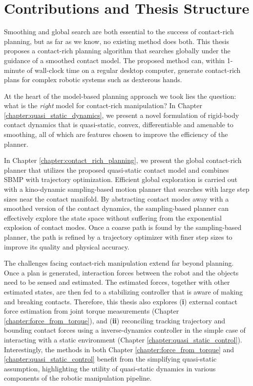 \section{Contributions and Thesis Structure}
Smoothing and global search are both essential to the success of contact-rich planning, but as far as we know, no existing method does both. This thesis proposes a contact-rich planning algorithm that searches globally under the guidance of a smoothed contact model. The proposed method can, within 1-minute of wall-clock time on a regular desktop computer, generate contact-rich plans for complex robotic systems such as dexterous hands.

At the heart of the model-based planning approach we took lies the question: what is the \emph{right} model for contact-rich manipulation? In Chapter \ref{chapter:quasi_static_dynamics}, we present a novel formulation of rigid-body contact dynamics that is quasi-static, convex, differentiable and amenable to smoothing, all of which are features chosen to improve the efficiency of the planner.

In Chapter \ref{chapter:contact_rich_planning}, we present the global contact-rich planner that utilizes the proposed quasi-static contact model and combines SBMP with trajectory optimization. Efficient global exploration is carried out with a kino-dynamic sampling-based motion planner that searches with large step sizes near the contact manifold. By abstracting contact modes away with a smoothed version of the contact dynamics, the sampling-based planner can effectively explore the state space without suffering from the exponential explosion of contact modes. Once a coarse path is found by the sampling-based planner, the path is refined by a trajectory optimizer with finer step sizes to improve its quality and physical accuracy. 

The challenges facing contact-rich manipulation extend far beyond planning. Once a plan is generated, interaction forces between the robot and the objects need to be sensed and estimated. The estimated forces, together with other estimated states, are then fed to a stabilizing controller that is aware of making and breaking contacts. 
Therefore, this thesis also explores (\textbf{i}) external contact force estimation from joint torque measurements (Chapter \ref{chapter:force_from_torque}), and (\textbf{ii}) reconciling tracking trajectory and bounding contact forces using a inverse-dynamics controller in the simple case of interacting with a static environment (Chapter \ref{chapter:quasi_static_control}). Interestingly, the methods in both Chapter \ref{chapter:force_from_torque} and \ref{chapter:quasi_static_control} benefit from the simplifying quasi-static assumption, highlighting the utility of quasi-static dynamics in various components of the robotic manipulation pipeline. 



